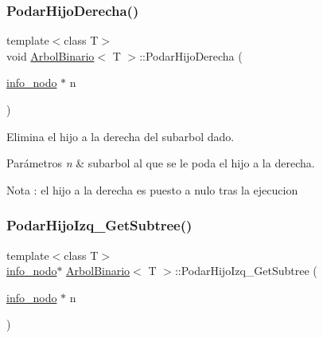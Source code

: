 \subsubsection{\texorpdfstring{Podar\+Hijo\+Derecha()}{PodarHijoDerecha()}}
{\footnotesize\ttfamily template$<$class T$>$ \\
void \hyperlink{classArbolBinario}{Arbol\+Binario}$<$ T $>$\+::Podar\+Hijo\+Derecha (\begin{DoxyParamCaption}\item[{\hyperlink{structArbolBinario_1_1info__nodo}{info\+\_\+nodo} $\ast$}]{n }\end{DoxyParamCaption})\hspace{0.3cm}{\ttfamily [private]}}



Elimina el hijo a la derecha del subarbol dado. 


\begin{DoxyParams}{Parámetros}
{\em n} & subarbol al que se le poda el hijo a la derecha. \\
\hline
\end{DoxyParams}
\begin{DoxyNote}{Nota}
\+: el hijo a la derecha es puesto a nulo tras la ejecucion 
\end{DoxyNote}
\mbox{\label{classArbolBinario_a307e743bfe1264ff6cba2d484f0eb578}} 
\subsubsection{\texorpdfstring{Podar\+Hijo\+Izq\+\_\+\+Get\+Subtree()}{PodarHijoIzq\_GetSubtree()}}
{\footnotesize\ttfamily template$<$class T$>$ \\
\hyperlink{structArbolBinario_1_1info__nodo}{info\+\_\+nodo}$\ast$ \hyperlink{classArbolBinario}{Arbol\+Binario}$<$ T $>$\+::Podar\+Hijo\+Izq\+\_\+\+Get\+Subtree (\begin{DoxyParamCaption}\item[{\hyperlink{structArbolBinario_1_1info__nodo}{info\+\_\+nodo} $\ast$}]{n }\end{DoxyParamCaption})\hspace{0.3cm}{\ttfamily [private]}}



